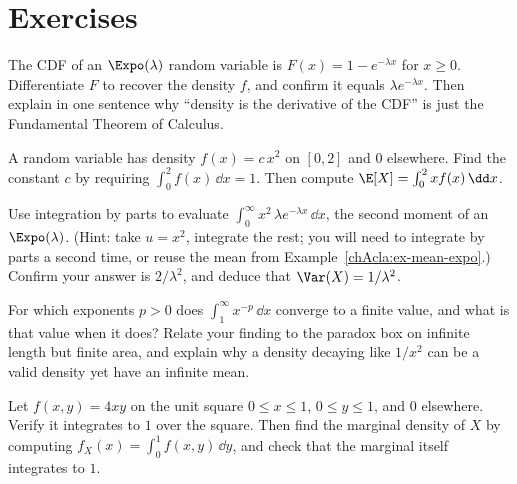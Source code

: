 \section{Exercises}
\label{chAcla:exercises}

\begin{exercise}
\label{chAcla:exr-density}
The CDF of an $\Expo(\lambda)$ random variable is $F(x)=1-e^{-\lambda x}$ for $x\ge 0$. Differentiate
$F$ to recover the density $f$, and confirm it equals $\lambda e^{-\lambda x}$. Then explain in one
sentence why ``density is the derivative of the CDF'' is just the Fundamental Theorem of Calculus.
\end{exercise}

\begin{exercise}
\label{chAcla:exr-normalize}
A random variable has density $f(x)=c\,x^2$ on $[0,2]$ and $0$ elsewhere. Find the constant $c$ by
requiring $\int_0^2 f(x)\,\dd x = 1$. Then compute $\E[X]=\int_0^2 x f(x)\,\dd x$.
\end{exercise}

\begin{exercise}
\label{chAcla:exr-parts}
Use integration by parts to evaluate $\int_0^\infty x^2\,\lambda e^{-\lambda x}\,\dd x$, the second
moment of an $\Expo(\lambda)$. (Hint: take $u=x^2$, integrate the rest; you will need to integrate by
parts a second time, or reuse the mean from Example~\ref{chAcla:ex-mean-expo}.) Confirm your answer is
$2/\lambda^2$, and deduce that $\Var(X)=1/\lambda^2$.
\end{exercise}

\begin{exercise}
\label{chAcla:exr-tail}
For which exponents $p>0$ does $\int_1^\infty x^{-p}\,\dd x$ converge to a finite value, and what is
that value when it does? Relate your finding to the paradox box on infinite length but finite area,
and explain why a density decaying like $1/x^2$ can be a valid density yet have an infinite mean.
\end{exercise}

\begin{exercise}
\label{chAcla:exr-marginal}
Let $f(x,y)=4xy$ on the unit square $0\le x\le 1$, $0\le y\le 1$, and $0$ elsewhere. Verify it
integrates to $1$ over the square. Then find the marginal density of $X$ by computing
$f_X(x)=\int_0^1 f(x,y)\,\dd y$, and check that the marginal itself integrates to $1$.
\end{exercise}

